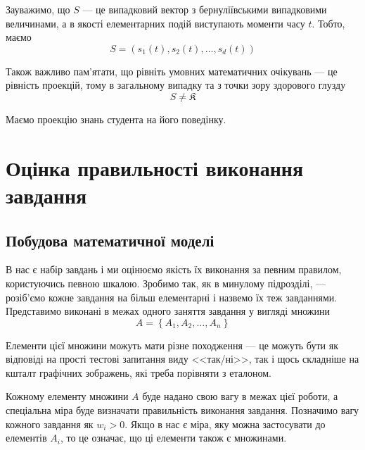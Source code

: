 Зауважимо, що $S$ --- це випадковий вектор з бернуліївськими випадковими
величинами, а в якості елементарних подій виступають моменти часу $t$.
Тобто, маємо
\begin{equation*}
  S = \left( s_1\left( t \right), s_2\left( t \right),
    \dots, s_d\left( t \right) \right)
\end{equation*}

Також важливо пам’ятати, що рівніть умовних математичних очікувань --- це
рівність проекцій, тому в загальному випадку та з точки зору здорового глузду
\begin{equation*}
  S \neq \mathfrak{K}
\end{equation*}

Маємо проекцію знань студента на його поведінку.

\section{Оцінка правильності виконання завдання}

\subsection{Побудова математичної моделі}

В нас є набір завдань і ми оцінюємо якість їх виконання за певним правилом,
користуючись певною шкалою.
Зробимо так, як в минулому підрозділі, --- розіб’ємо кожне завдання на більш
елементарні і назвемо їх теж завданнями.
Представимо виконані в межах одного заняття завдання у вигляді множини
\begin{equation*}
  A = \left\{ A_1, A_2, \dots, A_n \right\}
\end{equation*}

Елементи цієї множини можуть мати різне походження --- це можуть бути як
відповіді на прості тестові запитання виду <<так/ні>>, так і щось складніше на
кшталт графічних зображень, які треба порівняти з еталоном.

Кожному елементу множини $A$ буде надано свою вагу в межах цієї роботи,
а спеціальна міра буде визначати правильність виконання завдання.
Позначимо вагу кожного завдання як $w_i > 0$.
Якщо в нас є міра, яку можна застосувати до елементів $A_i$, то це означає, що
ці елементи також є множинами.

